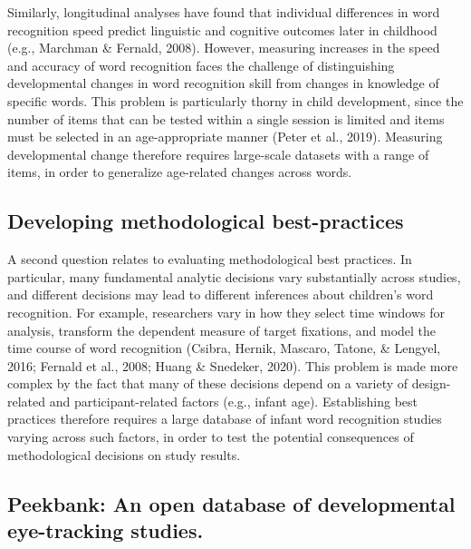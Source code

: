 \documentclass[
  english,
  man,floatsintext]{apa6}
\begin{document}
Similarly, longitudinal analyses have found that individual differences in word recognition speed predict linguistic and cognitive outcomes later in childhood (e.g., Marchman \& Fernald, 2008).
However, measuring increases in the speed and accuracy of word recognition faces the challenge of distinguishing developmental changes in word recognition skill from changes in knowledge of specific words.
This problem is particularly thorny in child development, since the number of items that can be tested within a single session is limited and items must be selected in an age-appropriate manner (Peter et al., 2019).
Measuring developmental change therefore requires large-scale datasets with a range of items, in order to generalize age-related changes across words.

\hypertarget{developing-methodological-best-practices}{%
\subsection{Developing methodological best-practices}\label{developing-methodological-best-practices}}

A second question relates to evaluating methodological best practices.
In particular, many fundamental analytic decisions vary substantially across studies, and different decisions may lead to different inferences about children's word recognition.
For example, researchers vary in how they select time windows for analysis, transform the dependent measure of target fixations, and model the time course of word recognition (Csibra, Hernik, Mascaro, Tatone, \& Lengyel, 2016; Fernald et al., 2008; Huang \& Snedeker, 2020).
This problem is made more complex by the fact that many of these decisions depend on a variety of design-related and participant-related factors (e.g., infant age).
Establishing best practices therefore requires a large database of infant word recognition studies varying across such factors, in order to test the potential consequences of methodological decisions on study results.

\hypertarget{peekbank-an-open-database-of-developmental-eye-tracking-studies.}{%
\subsection{Peekbank: An open database of developmental eye-tracking studies.}\label{peekbank-an-open-database-of-developmental-eye-tracking-studies.}}
\end{document}

